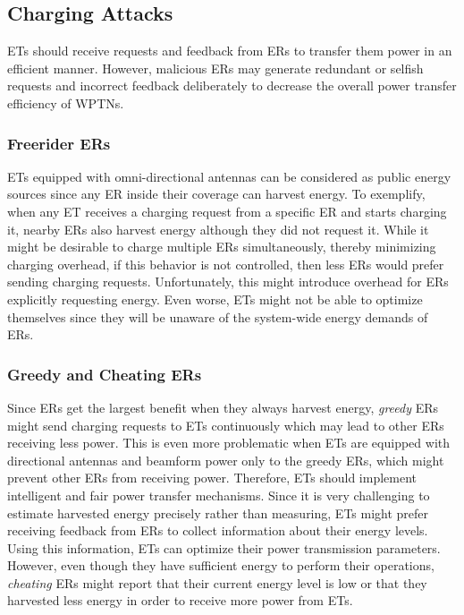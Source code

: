 \documentclass[journal,10pt,draftclsnofoot,onecolumn]{IEEEtran}
\begin{document}
\subsection{Charging Attacks}

ETs should receive requests and feedback from ERs to transfer them power in an efficient manner. However, malicious ERs may generate redundant or selfish requests and incorrect feedback deliberately to decrease the overall power transfer efficiency of WPTNs. 

\subsubsection{Freerider ERs}

ETs equipped with omni-directional antennas can be considered as public energy sources since any ER inside their coverage can harvest energy. To exemplify, when any ET receives a charging request from a specific ER and starts charging it, nearby ERs also harvest energy although they did not request it. While it might be desirable to charge multiple ERs simultaneously, thereby minimizing charging overhead, if this behavior is not controlled, then less ERs would prefer sending charging requests. Unfortunately, this might introduce overhead for ERs explicitly requesting energy. Even worse, ETs might not be able to optimize themselves since they will be unaware of the system-wide energy demands of ERs.

\subsubsection{Greedy and Cheating ERs}

Since ERs get the largest benefit when they always harvest energy, \emph{greedy} ERs might send charging requests to ETs continuously which may lead to other ERs receiving less power. This is even more problematic when ETs are equipped with directional antennas and beamform power only to the greedy ERs, which might prevent other ERs from receiving power. Therefore, ETs should implement intelligent and fair power transfer mechanisms. Since it is very challenging to estimate harvested energy precisely rather than measuring, ETs might prefer receiving feedback from ERs to collect information about their energy levels. Using this information, ETs can optimize their power transmission parameters. However, even though they have sufficient energy to perform their operations, \emph{cheating} ERs might report that their current energy level is low or that they harvested less energy in order to receive more power from ETs.
\end{document}
